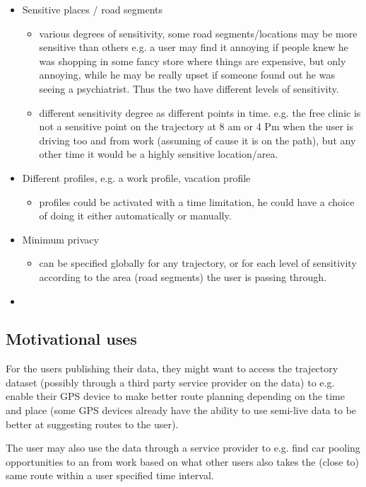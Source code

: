 \begin{itemize}
	\item Sensitive places / road segments
	\begin{itemize}
		\item various degrees of sensitivity, some road segments/locations may
		be more sensitive than others e.g. a user may find it annoying if
		people knew he was shopping in some fancy store where things are expensive,
		but only annoying, while he may be really upset if someone found out he
		was seeing a psychiatrist. Thus the two have different levels of sensitivity. 
		\item different sensitivity degree as different points in time. e.g. 
		the free clinic is not a sensitive point on the trajectory at 8 am or 4 Pm when
		the user is driving too and from work (assuming of cause it is on the path), but any
		other time it would be a highly sensitive location/area.
	\end{itemize}
	\item Different profiles, e.g. a work profile, vacation profile
	\begin{itemize}
		\item profiles could be activated with a time limitation, he could have a choice of doing 
		it either automatically or manually.
	\end{itemize}
	\item Minimum privacy 
	\begin{itemize}
		\item can be specified globally for any trajectory, or for each level of sensitivity
		according to the area (road segments) the user is passing through.
	\end{itemize}
	\item 
\end{itemize}

\subsection{Motivational uses}
For the users publishing their data, 
they might want to access the trajectory dataset (possibly through a third party service provider on the data) to e.g. enable their 
GPS device to make better route planning depending on the time and place (some GPS devices already have the ability to use 
semi-live data to be better at suggesting routes to the user).

The user may also use the data through a service provider to e.g. find car pooling opportunities to an from work based
on what other users also takes the (close to) same route within a user specified time interval.

